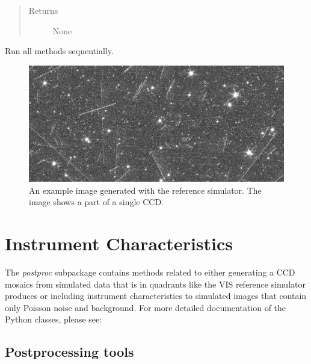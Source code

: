 \documentclass[a4paper,12pt,english]{sphinxmanual}
\begin{document}
\begin{fulllineitems}
\begin{fulllineitems}
\begin{quote}
\begin{description}
\item[{Returns}] \leavevmode
None

\end{description}\end{quote}

\end{fulllineitems}


\begin{fulllineitems}
\label{simulator:simulator.generateGalaxies.generateFakeData.runAll}
Run all methods sequentially.

\end{fulllineitems}


\end{fulllineitems}

\begin{figure}[htbp]
\centering
\capstart

\includegraphics{simu.pdf}
\caption{An example image generated with the reference simulator. The image shows a part of a single
CCD.}\end{figure}


\chapter{Instrument Characteristics}
\label{index:instrument-characteristics}
The \emph{postproc} subpackage contains methods related to either generating a CCD mosaics from simulated data
that is in quadrants like the VIS reference simulator produces or including instrument characteristics
to simulated images that contain only Poisson noise and background. For more detailed documentation
of the Python classes, please see:


\section{Postprocessing tools}
\label{postproc:postprocessing-tools}\label{postproc::doc}\label{postproc:module-postproc.postprocessing}
\end{document}
